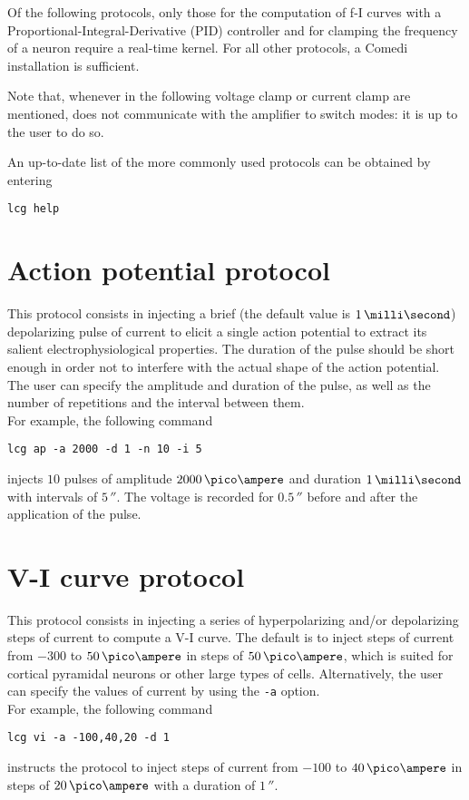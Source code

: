 Of the following protocols, only those for the computation of f-I
curves with a Proportional-Integral-Derivative (PID) controller and
for clamping the frequency of a neuron require a real-time kernel. For
all other protocols, a Comedi installation is sufficient.

Note that, whenever in the following voltage clamp or current clamp
are mentioned, \progname does not communicate with the amplifier to
switch modes: it is up to the user to do so.

An up-to-date list of the more commonly used protocols can be obtained
by entering
\begin{lstlisting}
lcg help
\end{lstlisting}

\section{Action potential protocol}
This protocol consists in injecting a brief (the default value is
$1\,\milli\second$) depolarizing pulse of current to elicit a single
action potential to extract its salient electrophysiological
properties. The duration of the pulse should be short enough in order
not to interfere with the actual shape of the action potential. The
user can specify the amplitude and duration of the pulse, as well as
the number of repetitions and the interval between them.\\
For example, the following command
\begin{lstlisting}
lcg ap -a 2000 -d 1 -n 10 -i 5
\end{lstlisting}
injects $10$ pulses of amplitude $2000\,\pico\ampere$ and duration
$1\,\milli\second$ with intervals of $5\,\second$. The voltage is
recorded for $0.5\,\second$ before and after the application of the pulse.

\section{V-I curve protocol}
This protocol consists in injecting a series of hyperpolarizing and/or
depolarizing steps of current to compute a V-I curve. The default
is to inject steps of current from $-300$ to $50\,\pico\ampere$ in
steps of $50\,\pico\ampere$, which is suited for cortical pyramidal
neurons or other large types of cells. Alternatively, the user can
specify the values of current by using the \verb+-a+ option.\\
For example, the following command
\begin{lstlisting}
lcg vi -a -100,40,20 -d 1
\end{lstlisting}
instructs the protocol to inject steps of current from $-100$ to
$40\,\pico\ampere$ in steps of $20\,\pico\ampere$ with a duration of
$1\,\second$.

